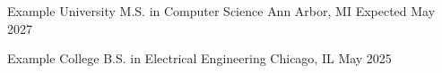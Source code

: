 
\VectraEducationEntry
    {Example University}
    {M.S. in Computer Science}
    {Ann Arbor, MI}
    {Expected May 2027}

\VectraEducationEntry
    {Example College}
    {B.S. in Electrical Engineering}
    {Chicago, IL}
    {May 2025}
